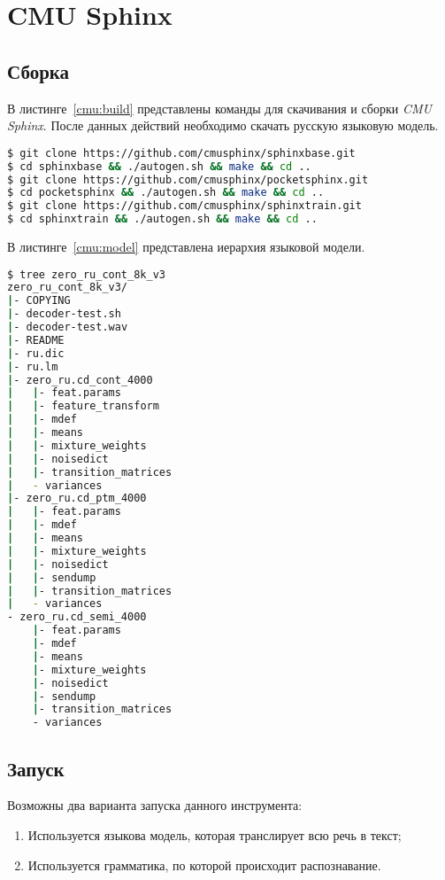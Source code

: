 \section{CMU Sphinx}
\subsection{Сборка}

В листинге~\ref{cmu:build} представлены команды для скачивания и сборки \textit{CMU Sphinx}.
После данных действий необходимо скачать русскую языковую модель.

\begin{minipage}{\linewidth}

\begin{lstlisting}[caption={Клонирование и сборка необходимых интсрументов},label={cmu:build},language=bash]
$ git clone https://github.com/cmusphinx/sphinxbase.git
$ cd sphinxbase && ./autogen.sh && make && cd ..
$ git clone https://github.com/cmusphinx/pocketsphinx.git
$ cd pocketsphinx && ./autogen.sh && make && cd ..
$ git clone https://github.com/cmusphinx/sphinxtrain.git
$ cd sphinxtrain && ./autogen.sh && make && cd ..
\end{lstlisting}

\end{minipage}

В листинге~\ref{cmu:model} представлена иерархия языковой модели.

\begin{minipage}{\linewidth}
\begin{lstlisting}[caption={Иерархия языковой модели},label={cmu:model},language=bash]
$ tree zero_ru_cont_8k_v3
zero_ru_cont_8k_v3/
|- COPYING
|- decoder-test.sh
|- decoder-test.wav
|- README
|- ru.dic
|- ru.lm
|- zero_ru.cd_cont_4000
|   |- feat.params
|   |- feature_transform
|   |- mdef
|   |- means
|   |- mixture_weights
|   |- noisedict
|   |- transition_matrices
|   - variances
|- zero_ru.cd_ptm_4000
|   |- feat.params
|   |- mdef
|   |- means
|   |- mixture_weights
|   |- noisedict
|   |- sendump
|   |- transition_matrices
|   - variances
- zero_ru.cd_semi_4000
    |- feat.params
    |- mdef
    |- means
    |- mixture_weights
    |- noisedict
    |- sendump
    |- transition_matrices
    - variances
\end{lstlisting}
\end{minipage}

\subsection{Запуск}
Возможны два варианта запуска данного инструмента:
\begin{enumerate}
    \item Используется языкова модель, которая транслирует всю речь в текст;
    \item Используется грамматика, по которой происходит распознавание.
\end{enumerate}

